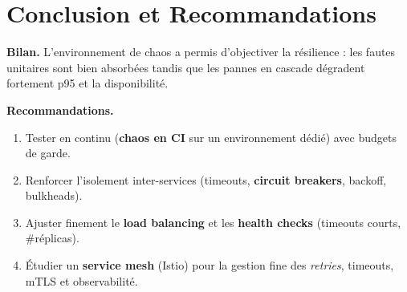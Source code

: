 \chapter*{Conclusion et Recommandations}
\textbf{Bilan.} L'environnement de chaos a permis d'objectiver la résilience : les fautes unitaires sont
bien absorbées tandis que les pannes en cascade dégradent fortement p95 et la disponibilité.

\textbf{Recommandations.}
\begin{enumerate}
  \item Tester en continu (\textbf{chaos en CI} sur un environnement dédié) avec budgets de garde.
  \item Renforcer l'isolement inter-services (timeouts, \textbf{circuit breakers}, backoff, bulkheads).
  \item Ajuster finement le \textbf{load balancing} et les \textbf{health checks} (timeouts courts, \#réplicas).
  \item Étudier un \textbf{service mesh} (Istio) pour la gestion fine des \textit{retries}, timeouts, mTLS et observabilité.
\end{enumerate}